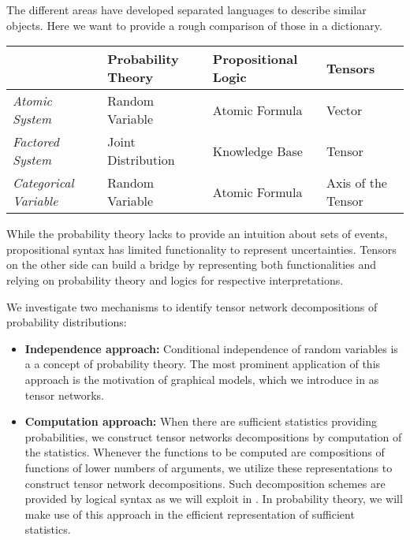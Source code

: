 The different areas have developed separated languages to describe similar objects.
Here we want to provide a rough comparison of those in a dictionary.

\begin{tabular}{|p{\fourcolumnwidth}|p{\fourcolumnwidth}|p{\fourcolumnwidth}|p{\fourcolumnwidth}|}
    \hline
    & \textbf{Probability Theory} & \textbf{Propositional Logic} & \textbf{Tensors}   \\
    \hline
    \textit{Atomic System}        & Random Variable             & Atomic Formula               & Vector             \\
    \textit{Factored System}      & Joint Distribution          & Knowledge Base               & Tensor             \\
    \textit{Categorical Variable} & Random Variable             & Atomic Formula               & Axis of the Tensor \\
    \hline
\end{tabular}

While the probability theory lacks to provide an intuition about sets of events, propositional syntax has limited functionality to represent uncertainties.
Tensors on the other side can build a bridge by representing both functionalities and relying on probability theory and logics for respective interpretations.


We investigate two mechanisms to identify tensor network decompositions of probability distributions:
\begin{itemize}
    \item \textbf{Independence approach:} Conditional independence of random variables is a a concept of probability theory.
       The most prominent application of this approach is the motivation of graphical models, which we introduce in  as tensor networks.
    \item \textbf{Computation approach:} When there are sufficient statistics providing probabilities, we construct tensor networks decompositions by computation of the statistics.
        Whenever the functions to be computed are compositions of functions of lower numbers of arguments, we utilize these representations to construct tensor network decompositions.
        Such decomposition schemes are provided by logical syntax as we will exploit in .
        In probability theory, we will make use of this approach in the efficient representation of sufficient statistics.
\end{itemize}
